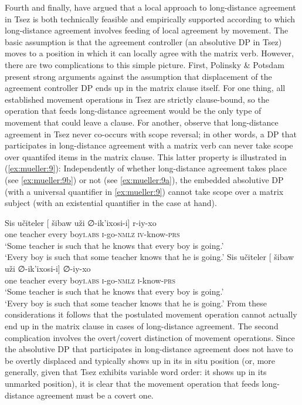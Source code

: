 \documentclass[output=paper
,modfonts
,nonflat]{langsci/langscibook}
\begin{document}
	Fourth and finally, \cite{PolinskyPotsdam:01} have argued that a
	local approach to long-distance agreement in Tsez is both technically
	feasible and empirically supported according to which long-distance
	agreement involves feeding of local agreement by movement. The basic
	assumption is that the agreement controller (an absolutive DP in Tsez)
	moves to a position in which it can locally agree with the matrix
	verb. However, there are two complications to this simple
	picture. First, Polinsky \& Potsdam present strong arguments against
	the assumption that displacement of the agreement controller DP ends
	up in the matrix clause itself. For one thing, all established
	movement operations in Tsez are strictly clause-bound, so the 
	operation that feeds long-distance agreement would be the only type of
	movement that could leave a clause. For another,
	\cite{PolinskyPotsdam:01} observe that long-distance
	agreement in Tsez never co-occurs with scope reversal; in other words,
	a DP that participates in long-distance agreement with a matrix verb
	can never take scope over quantifed items in the matrix clause.
	This latter property is illustrated in (\ref{ex:mueller:9}): Independently of whether
	long-distance agreement takes place (see \ref{ex:mueller:9b}) or not (see
	\ref{ex:mueller:9a}), the embedded absolutive DP (with a universal quantifier in
	\ref{ex:mueller:9}) cannot take scope over a  matrix subject (with an existential
	quantifier in the case at hand). 
	
	\ea \label{ex:mueller:9}  \label{scope32}
	\ea \label{ex:mueller:9a}
	\gll Sis u\v{c}iteler [\sub{$\alpha$} \v{s}ibaw u\v{z}i ∅-ik'ixosi-\textbeltl i] r-iy-xo \\
	one teacher {} every boy{\scshape i}.{\scshape abs} {\scshape i}-go-{\scshape nmlz} {\scshape iv}-know-{\scshape prs}  \\
	\glt `Some teacher is such that he knows that every boy is going.'\\
	`Every boy is such that some teacher knows that he is going.'
	\ex \label{ex:mueller:9b}
	\gll Sis u\v{c}iteler [\sub{$\alpha$} \v{s}ibaw u\v{z}i ∅-ik'ixosi-\textbeltl i] ∅-iy-xo \\
	one teacher {} every boy{\scshape i}.{\scshape abs} {\scshape i}-go-{\scshape nmlz} {\scshape i}-know-{\scshape prs}  \\
	\glt      `Some teacher is such that he knows that every boy is going.'\\
	`Every boy is such that some teacher knows that he is going.'
	\z
	\z
	From these considerations it follows that the postulated movement operation
	cannot actually end up in the matrix clause in cases of long-distance
	agreement. The second complication involves the overt/covert
	distinction of movement operations. Since the absolutive DP that participates in
	long-distance agreement does not have to be overtly
	displaced and typically shows up in its in situ position (or, more generally, given
	that Tsez exhibits variable word order: it shows up in its unmarked position),
	it is clear that the movement operation that feeds long-distance
	agreement must be a covert one. 
	
\end{document}
